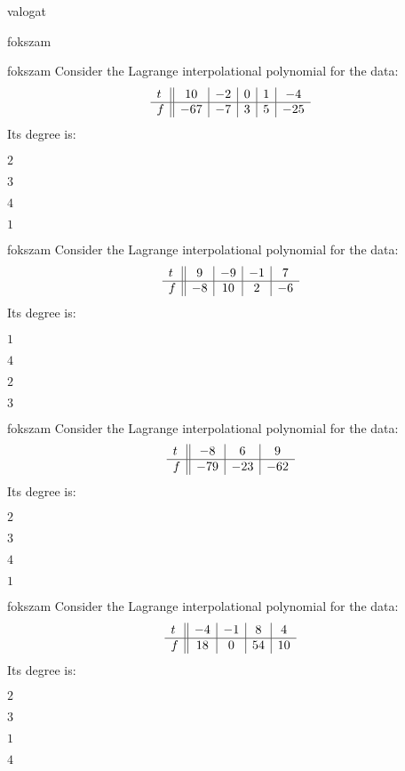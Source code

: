 \documentclass[12pt]{article}
\begin{document}
\begin{quiz}{valogat}
\begin{multi}{fokszam}
\end{multi}
\begin{multi}{fokszam}
Consider the Lagrange interpolational polynomial for the data:
$$\begin{array}{l ||c|c|c|c|c}t&10&-2&0&1&-4\\ \hline f&-67&-7&3&5&-25 \\ \end{array}$$
Its degree is:
\item* $ 2 $
\item  $ 3 $
\item  $ 4 $
\item  $ 1 $
\end{multi}
\begin{multi}{fokszam}
Consider the Lagrange interpolational polynomial for the data:
$$\begin{array}{l ||c|c|c|c}t&9&-9&-1&7\\ \hline f&-8&10&2&-6 \\ \end{array}$$
Its degree is:
\item* $ 1 $
\item  $ 4 $
\item  $ 2 $
\item  $ 3 $
\end{multi}
\begin{multi}{fokszam}
Consider the Lagrange interpolational polynomial for the data:
$$\begin{array}{l ||c|c|c}t&-8&6&9\\ \hline f&-79&-23&-62 \\ \end{array}$$
Its degree is:
\item* $ 2 $
\item  $ 3 $
\item  $ 4 $
\item  $ 1 $
\end{multi}
\begin{multi}{fokszam}
Consider the Lagrange interpolational polynomial for the data:
$$\begin{array}{l ||c|c|c|c}t&-4&-1&8&4\\ \hline f&18&0&54&10 \\ \end{array}$$
Its degree is:
\item* $ 2 $
\item  $ 3 $
\item  $ 1 $
\item  $ 4 $
\end{multi}

\end{quiz}
\end{document}
